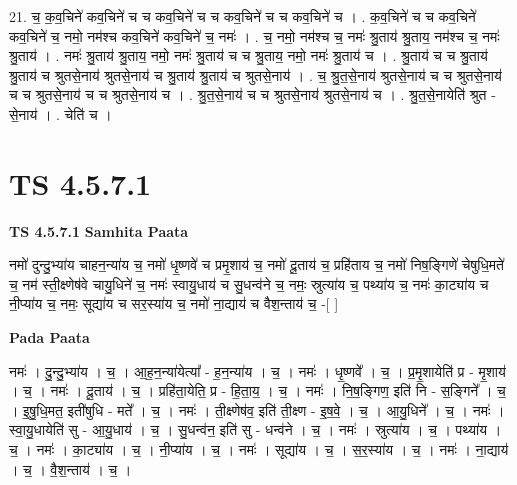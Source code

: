 \documentclass[17pt]{extarticle}
\begin{document}
21. च॒ क॒व॒चिने॑ कव॒चिने॑ च च कव॒चिने॑ च च कव॒चिने॑ च च कव॒चिने॑ च । . क॒व॒चिने॑ च च कव॒चिने॑ कव॒चिने॑ च॒ नमो॒ नम॑श्च कव॒चिने॑ कव॒चिने॑ च॒ नमः॑ । . च॒ नमो॒ नम॑श्च च॒ नमः॑ श्रु॒ताय॑ श्रु॒ताय॒ नम॑श्च च॒ नमः॑ श्रु॒ताय॑ । . नमः॑ श्रु॒ताय॑ श्रु॒ताय॒ नमो॒ नमः॑ श्रु॒ताय॑ च च श्रु॒ताय॒ नमो॒ नमः॑ श्रु॒ताय॑ च । . श्रु॒ताय॑ च च श्रु॒ताय॑ श्रु॒ताय॑ च श्रुतसे॒नाय॑ श्रुतसे॒नाय॑ च श्रु॒ताय॑ श्रु॒ताय॑ च श्रुतसे॒नाय॑ । . च॒ श्रु॒त॒से॒नाय॑ श्रुतसे॒नाय॑ च च श्रुतसे॒नाय॑ च च श्रुतसे॒नाय॑ च च श्रुतसे॒नाय॑ च । . श्रु॒त॒से॒नाय॑ च च श्रुतसे॒नाय॑ श्रुतसे॒नाय॑ च । . श्रु॒त॒से॒नायेति॑ श्रुत - से॒नाय॑ । . चेति॑ च । \newline
\pagebreak
{}

\section{ TS 4.5.7.1 }

\textbf{TS 4.5.7.1 } \newline
\textbf{Samhita Paata} \newline

नमो॑ दुन्दु॒भ्या॑य चाहन॒न्या॑य च॒ नमो॑ धृ॒ष्णवे॑ च प्रमृ॒शाय॑ च॒ नमो॑ दू॒ताय॑ च॒ प्रहि॑ताय च॒ नमो॑ निष॒ङ्गिणे॑ चेषुधि॒मते॑ च॒ नम॑ स्ती॒क्ष्णेष॑वे चायु॒धिने॑ च॒ नमः॑ स्वायु॒धाय॑ च सु॒धन्व॑ने च॒ नमः॒ स्रुत्या॑य च॒ पथ्या॑य च॒ नमः॑ का॒ट्या॑य च नी॒प्या॑य च॒ नमः॒ सूद्या॑य च सर॒स्या॑य च॒ नमो॑ ना॒द्याय॑ च वैश॒न्ताय॑ च॒ -[  ] \newline

\textbf{Pada Paata} \newline

नमः॑ । दु॒न्दु॒भ्या॑य । च॒ । आ॒ह॒न॒न्या॑येत्या᳚ - ह॒न॒न्या॑य । च॒ । नमः॑ । धृ॒ष्णवे᳚ । च॒ । प्र॒मृ॒शायेति॑ प्र - मृ॒शाय॑ । च॒ । नमः॑ । दू॒ताय॑ । च॒ । प्रहि॑ता॒येति॒ प्र - हि॒ता॒य॒ । च॒ । नमः॑ । नि॒ष॒ङ्गिण॒ इति॑ नि - स॒ङ्गिने᳚ । च॒ । इ॒षु॒धि॒मत॒ इती॑षुधि - मते᳚ । च॒ । नमः॑ । ती॒क्ष्णेष॑व॒ इति॑ ती॒क्ष्ण - इ॒ष॒वे॒ । च॒ । आ॒यु॒धिने᳚ । च॒ । नमः॑ । स्वा॒यु॒धायेति॑ सु - आ॒यु॒धाय॑ । च॒ । सु॒धन्व॑न॒ इति॑ सु - धन्व॑ने । च॒ । नमः॑ । स्रुत्या॑य । च॒ । पथ्या॑य । च॒ । नमः॑ । का॒ट्या॑य । च॒ । नी॒प्या॑य । च॒ । नमः॑ । सूद्या॑य । च॒ । स॒र॒स्या॑य । च॒ । नमः॑ । ना॒द्याय॑ । च॒ । वै॒श॒न्ताय॑ । च॒ ।  \newline
\end{document}
